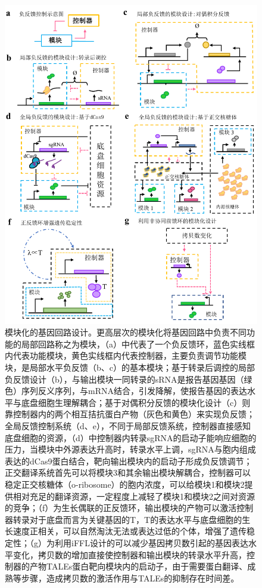 \documentclass[b5paper,9pt,oneolumn,twoside,UTF8]{article}
\begin{document}
\begin{figure}[H]
  \centering
  \includegraphics[width=1.0\textwidth]{reviewer_figure3}
  \caption{模块化的基因回路设计。{\scriptsize 更高层次的模块化将基因回路中负责不同功能的局部回路称之为模块，（a）中代表了一个负反馈环，蓝色实线框内代表功能模块，黄色实线框内代表控制器，主要负责调节功能模块，是局部水平负反馈（b、c）的基本模块；基于转录后调控的局部负反馈设计（b），与输出模块一同转录的sRNA是报告基因基因（绿色）序列反义序列，与mRNA结合，引发降解，使报告基因的表达水平与底盘细胞生理解耦合；基于对偶积分反馈的模块化设计（c）则靠控制器内的两个相互拮抗蛋白产物（灰色和黄色）来实现负反馈；全局反馈控制系统（d、e），不同于局部反馈系统，控制器直接感知底盘细胞的资源，（d）中控制器内转录sgRNA的启动子能响应细胞的压力，当模块中外源表达升高时，转录水平上调，sgRNA与胞内组成表达的dCas9蛋白结合，靶向输出模块内的启动子形成负反馈调节；正交翻译系统首先可以将模块3和其余输出模块解耦合，控制器可以稳定正交核糖体（o-ribosome）的胞内浓度，可以给模块1和模块2提供相对充足的翻译资源，一定程度上减轻了模块1和模块2之间对资源的竞争；（f）为生长偶联的正反馈环，输出模块的产物可以激活控制器转录对于底盘而言为关键基因的T，T的表达水平与底盘细胞的生长速度正相关，可以自然淘汰无法或表达过低的个体，增强了遗传稳定性；（g）为利用iFFL设计的可以减少基因拷贝数引起的基因表达水平变化，拷贝数的增加直接使控制器和输出模块的转录水平升高，控制器的产物TALEs蛋白靶向模块内的启动子，由于需要蛋白翻译、成熟等步骤，造成拷贝数的激活作用与TALEs的抑制存在时间差。}}
  \label{fig.3}
\end{figure}
\end{document}
